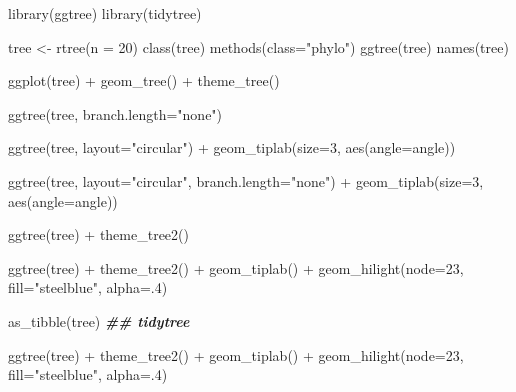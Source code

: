 \documentclass[
]{book}
\newenvironment{Shaded}{\begin{snugshade}}{\end{snugshade}}
\newcommand{\AttributeTok}[1]{\textcolor[rgb]{0.77,0.63,0.00}{#1}}
\newcommand{\DecValTok}[1]{\textcolor[rgb]{0.00,0.00,0.81}{#1}}
\newcommand{\DocumentationTok}[1]{\textcolor[rgb]{0.56,0.35,0.01}{\textbf{\textit{#1}}}}
\newcommand{\FunctionTok}[1]{\textcolor[rgb]{0.00,0.00,0.00}{#1}}
\newcommand{\NormalTok}[1]{#1}
\newcommand{\OtherTok}[1]{\textcolor[rgb]{0.56,0.35,0.01}{#1}}
\newcommand{\SpecialCharTok}[1]{\textcolor[rgb]{0.00,0.00,0.00}{#1}}
\newcommand{\StringTok}[1]{\textcolor[rgb]{0.31,0.60,0.02}{#1}}
\begin{document}
\begin{Shaded}
\begin{Highlighting}[]

\FunctionTok{library}\NormalTok{(ggtree)}
\FunctionTok{library}\NormalTok{(tidytree)}


\NormalTok{tree }\OtherTok{\textless{}{-}} \FunctionTok{rtree}\NormalTok{(}\AttributeTok{n =} \DecValTok{20}\NormalTok{)}
\FunctionTok{class}\NormalTok{(tree)           }
\FunctionTok{methods}\NormalTok{(}\AttributeTok{class=}\StringTok{"phylo"}\NormalTok{)}
\FunctionTok{ggtree}\NormalTok{(tree)}
\FunctionTok{names}\NormalTok{(tree)}

\FunctionTok{ggplot}\NormalTok{(tree) }\SpecialCharTok{+}
  \FunctionTok{geom\_tree}\NormalTok{() }\SpecialCharTok{+}
  \FunctionTok{theme\_tree}\NormalTok{()}
  

\FunctionTok{ggtree}\NormalTok{(tree, }\AttributeTok{branch.length=}\StringTok{"none"}\NormalTok{)}

\FunctionTok{ggtree}\NormalTok{(tree, }\AttributeTok{layout=}\StringTok{"circular"}\NormalTok{) }\SpecialCharTok{+}
  \FunctionTok{geom\_tiplab}\NormalTok{(}\AttributeTok{size=}\DecValTok{3}\NormalTok{, }\FunctionTok{aes}\NormalTok{(}\AttributeTok{angle=}\NormalTok{angle))}

\FunctionTok{ggtree}\NormalTok{(tree, }\AttributeTok{layout=}\StringTok{"circular"}\NormalTok{, }\AttributeTok{branch.length=}\StringTok{"none"}\NormalTok{) }\SpecialCharTok{+}
  \FunctionTok{geom\_tiplab}\NormalTok{(}\AttributeTok{size=}\DecValTok{3}\NormalTok{, }\FunctionTok{aes}\NormalTok{(}\AttributeTok{angle=}\NormalTok{angle))}

\FunctionTok{ggtree}\NormalTok{(tree) }\SpecialCharTok{+}
  \FunctionTok{theme\_tree2}\NormalTok{()}


\FunctionTok{ggtree}\NormalTok{(tree) }\SpecialCharTok{+}
  \FunctionTok{theme\_tree2}\NormalTok{() }\SpecialCharTok{+}
  \FunctionTok{geom\_tiplab}\NormalTok{() }\SpecialCharTok{+}
  \FunctionTok{geom\_hilight}\NormalTok{(}\AttributeTok{node=}\DecValTok{23}\NormalTok{, }\AttributeTok{fill=}\StringTok{"steelblue"}\NormalTok{, }\AttributeTok{alpha=}\NormalTok{.}\DecValTok{4}\NormalTok{) }

\FunctionTok{as\_tibble}\NormalTok{(tree) }\DocumentationTok{\#\# tidytree}


\FunctionTok{ggtree}\NormalTok{(tree) }\SpecialCharTok{+}
  \FunctionTok{theme\_tree2}\NormalTok{() }\SpecialCharTok{+}
  \FunctionTok{geom\_tiplab}\NormalTok{() }\SpecialCharTok{+}
  \FunctionTok{geom\_hilight}\NormalTok{(}\AttributeTok{node=}\DecValTok{23}\NormalTok{, }\AttributeTok{fill=}\StringTok{"steelblue"}\NormalTok{, }\AttributeTok{alpha=}\NormalTok{.}\DecValTok{4}\NormalTok{) }



\end{Highlighting}
\end{Shaded}
\end{document}
